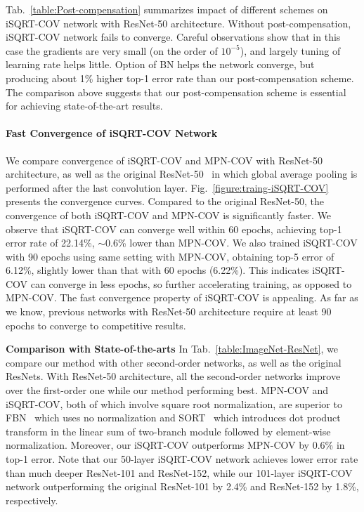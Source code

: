 \documentclass[10pt,twocolumn,letterpaper]{article}
\begin{document}
Tab.~\ref{table:Post-compensation} summarizes impact of different schemes on iSQRT-COV network with ResNet-50 architecture. Without post-compensation, iSQRT-COV network fails to converge. Careful observations show that in this case  the gradients are very small (on the order of $10^{-5}$), and largely tuning of learning rate helps little. Option of BN helps the network converge, but producing about 1\% higher top-1  error rate than our post-compensation scheme. The comparison above suggests that our post-compensation scheme is essential for achieving state-of-the-art results.  


\vspace{-8pt}\paragraph{Fast Convergence of iSQRT-COV Network}
We compare convergence of iSQRT-COV and MPN-COV with ResNet-50 architecture, as well as the original ResNet-50~\cite{He_2016_CVPR} in which  global average pooling is performed after the last convolution layer. Fig.~\ref{figure:traing-iSQRT-COV} presents the convergence curves. Compared to the original ResNet-50, the convergence of both iSQRT-COV and MPN-COV is significantly faster. We  observe that  iSQRT-COV can converge well within 60 epochs, achieving top-1 error rate of 22.14\%, $\sim$0.6\% lower than MPN-COV. We also trained iSQRT-COV with  90 epochs using  same setting with MPN-COV, obtaining top-5 error of 6.12\%, slightly lower than  that with 60 epochs (6.22\%). This indicates  iSQRT-COV can converge in less epochs, so further accelerating training, as opposed to MPN-COV.   The fast convergence property of iSQRT-COV is appealing. As far as we know, previous networks with ResNet-50 architecture require at least 90 epochs to converge to  competitive results.


\vspace{4pt}\noindent\textbf{Comparison with State-of-the-arts}\quad 
In Tab.~\ref{table:ImageNet-ResNet}, we compare our method with other second-order networks, as well as the original ResNets. With ResNet-50 architecture, all the second-order networks improve over the first-order one while our method performing best. MPN-COV and iSQRT-COV, both of which involve square root normalization, are superior to  FBN~\cite{LiYanghao_2017_ICCV} which uses no normalization and SORT~\cite{Wang_2017_ICCV} which introduces dot product transform in the linear sum of two-branch module followed by element-wise normalization. Moreover, our iSQRT-COV  outperforms MPN-COV by  0.6\% in top-1 error. Note that our 50-layer iSQRT-COV network achieves lower error rate  than much deeper  ResNet-101 and ResNet-152, while our 101-layer iSQRT-COV network outperforming the original ResNet-101 by 2.4\% and ResNet-152 by 1.8\%, respectively.
\end{document}
